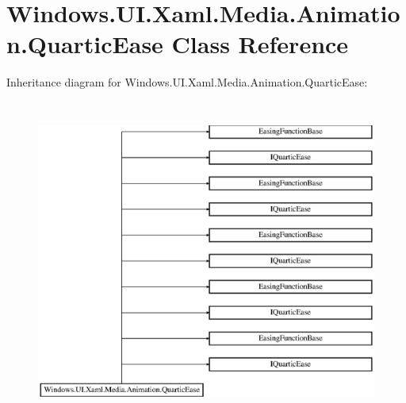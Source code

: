 \hypertarget{class_windows_1_1_u_i_1_1_xaml_1_1_media_1_1_animation_1_1_quartic_ease}{}\section{Windows.\+U\+I.\+Xaml.\+Media.\+Animation.\+Quartic\+Ease Class Reference}
\label{class_windows_1_1_u_i_1_1_xaml_1_1_media_1_1_animation_1_1_quartic_ease}
Inheritance diagram for Windows.\+U\+I.\+Xaml.\+Media.\+Animation.\+Quartic\+Ease\+:\begin{figure}[H]
\begin{center}
\leavevmode
\includegraphics[height=10.657439cm]{class_windows_1_1_u_i_1_1_xaml_1_1_media_1_1_animation_1_1_quartic_ease}
\end{center}
\end{figure}
